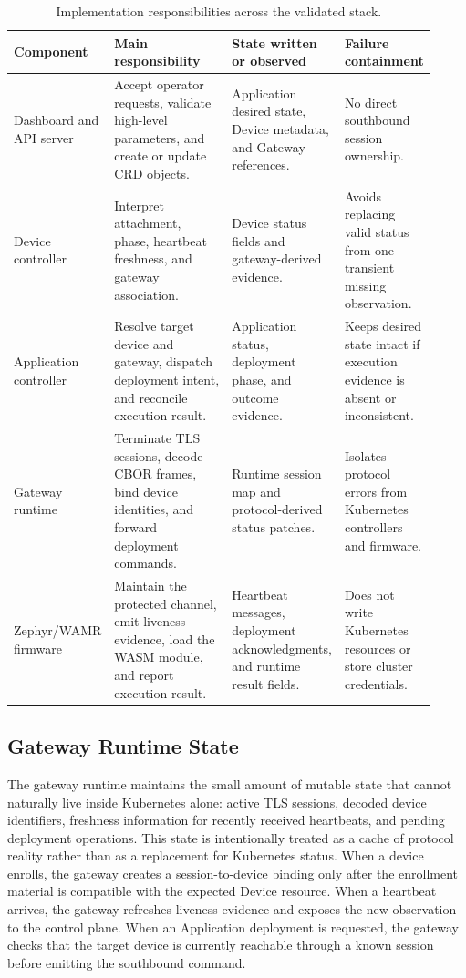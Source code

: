 \begin{table}[pos=t]
\centering
\caption{Implementation responsibilities across the validated stack.}
\label{tab:implementation-components}
\footnotesize
\setlength{\tabcolsep}{3pt}
\begin{tabular}{p{0.18\linewidth} p{0.32\linewidth} p{0.25\linewidth} p{0.17\linewidth}}
\toprule
\textbf{Component} & \textbf{Main responsibility} & \textbf{State written or observed} & \textbf{Failure containment} \\
\midrule
Dashboard and API server & Accept operator requests, validate high-level parameters, and create or update CRD objects. & Application desired state, Device metadata, and Gateway references. & No direct southbound session ownership. \\
Device controller & Interpret attachment, phase, heartbeat freshness, and gateway association. & Device status fields and gateway-derived evidence. & Avoids replacing valid status from one transient missing observation. \\
Application controller & Resolve target device and gateway, dispatch deployment intent, and reconcile execution result. & Application status, deployment phase, and outcome evidence. & Keeps desired state intact if execution evidence is absent or inconsistent. \\
Gateway runtime & Terminate TLS sessions, decode CBOR frames, bind device identities, and forward deployment commands. & Runtime session map and protocol-derived status patches. & Isolates protocol errors from Kubernetes controllers and firmware. \\
Zephyr/WAMR firmware & Maintain the protected channel, emit liveness evidence, load the WASM module, and report execution result. & Heartbeat messages, deployment acknowledgments, and runtime result fields. & Does not write Kubernetes resources or store cluster credentials. \\
\bottomrule
\end{tabular}
\end{table}

\subsection{Gateway Runtime State}
The gateway runtime maintains the small amount of mutable state that cannot naturally live inside Kubernetes alone: active TLS sessions, decoded device identifiers, freshness information for recently received heartbeats, and pending deployment operations. This state is intentionally treated as a cache of protocol reality rather than as a replacement for Kubernetes status. When a device enrolls, the gateway creates a session-to-device binding only after the enrollment material is compatible with the expected Device resource. When a heartbeat arrives, the gateway refreshes liveness evidence and exposes the new observation to the control plane. When an Application deployment is requested, the gateway checks that the target device is currently reachable through a known session before emitting the southbound command.

